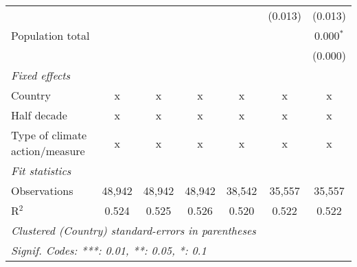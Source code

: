 \begin{tabular}{lcccccc}
                                                                            &              &               &                &                & (0.013)        & (0.013)\\   
   Population total                                                         &              &               &                &                &                & 0.000$^{*}$\\   
                                                                            &              &               &                &                &                & (0.000)\\   
   \emph{Fixed effects}\\
   Country                                                                  & x            & x             & x              & x              & x              & x\\  
   Half decade                                                              & x            & x             & x              & x              & x              & x\\  
   Type of climate action/measure                                           & x            & x             & x              & x              & x              & x\\  
   \midrule \emph{Fit statistics}\\
   Observations                                                             & 48,942       & 48,942        & 48,942         & 38,542         & 35,557         & 35,557\\  
   R$^2$                                                                    & 0.524        & 0.525         & 0.526          & 0.520          & 0.522          & 0.522\\  
   \midrule
   \multicolumn{7}{l}{\emph{Clustered (Country) standard-errors in parentheses}}\\
   \multicolumn{7}{l}{\emph{Signif. Codes: ***: 0.01, **: 0.05, *: 0.1}}\\
\end{tabular}
\par\endgroup


